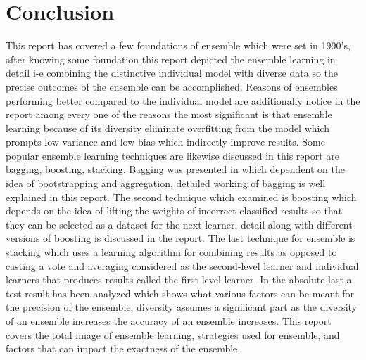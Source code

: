 \documentclass[12pt]{article}
\begin{document}
\section{Conclusion}
This report has covered a few foundations of ensemble which were set in 1990's, after knowing some foundation this report depicted the ensemble learning in detail i-e combining the distinctive individual model with diverse data so the precise outcomes of the ensemble can be accomplished. Reasons of ensembles performing better compared to the individual model are additionally notice in the report among every one of the reasons the most significant is that ensemble learning because of its diversity eliminate overfitting from the model which prompts low variance and low bias which indirectly improve results. Some popular ensemble learning techniques are likewise discussed in this report are bagging, boosting, stacking. Bagging was presented in \citep{breiman1996bagging} which dependent on the idea of bootstrapping and aggregation, detailed working of bagging is well explained in this report. The second technique which examined is boosting which depends on the idea of lifting the weights of incorrect classified results so that they can be selected as a dataset for the next learner, detail along with different versions of boosting is discussed in the report. The last technique for ensemble is stacking which uses a learning algorithm for combining results as opposed to casting a vote and averaging considered as the second-level learner and individual learners that produces results called the first-level learner. In the absolute last a test result has been analyzed which shows what various factors can be meant for the precision of the ensemble, diversity assumes a significant part as the diversity of an ensemble increases the accuracy of an ensemble increases. This report covers the total image of ensemble learning, strategies used for ensemble, and factors that can impact the exactness of the ensemble.

\singlespacing



\end{document}
